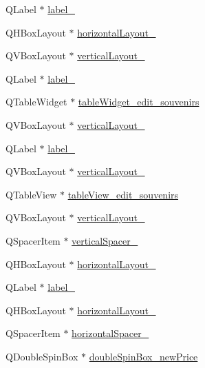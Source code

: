 \begin{DoxyCompactItemize}
\item 
Q\+Label $\ast$ \hyperlink{class_ui___main_window_ac6c19d112b25073d9276c377d00dbadb}{label\+\_}
\item 
Q\+H\+Box\+Layout $\ast$ \hyperlink{class_ui___main_window_a9403b9a7c13814220caeb1748ef9e672}{horizontal\+Layout\+\_}
\item 
Q\+V\+Box\+Layout $\ast$ \hyperlink{class_ui___main_window_a2e443acea8dcdda2848b1ab2daf3876e}{vertical\+Layout\+\_}
\item 
Q\+Label $\ast$ \hyperlink{class_ui___main_window_aa0d07c96f36b94e35e584256ee6b6d9e}{label\+\_}
\item 
Q\+Table\+Widget $\ast$ \hyperlink{class_ui___main_window_a08793e9cc653dd2624f6015cb1b67fe2}{table\+Widget\+\_\+edit\+\_\+souvenirs}
\item 
Q\+V\+Box\+Layout $\ast$ \hyperlink{class_ui___main_window_a1dd03599a38ab88cc01201488e5786b4}{vertical\+Layout\+\_}
\item 
Q\+Label $\ast$ \hyperlink{class_ui___main_window_a92ada1ca7f65b72ecf4cba1198c44380}{label\+\_}
\item 
Q\+V\+Box\+Layout $\ast$ \hyperlink{class_ui___main_window_a9022dbb281d9d46048c96ca1041e0905}{vertical\+Layout\+\_}
\item 
Q\+Table\+View $\ast$ \hyperlink{class_ui___main_window_af977a987af5fe8ca359761cc67c2eb97}{table\+View\+\_\+edit\+\_\+souvenirs}
\item 
Q\+V\+Box\+Layout $\ast$ \hyperlink{class_ui___main_window_a22115df48ffb70e4c1386c3a6f0c2bdb}{vertical\+Layout\+\_}
\item 
Q\+Spacer\+Item $\ast$ \hyperlink{class_ui___main_window_a03070eb30778c51f041c2993781f2bcb}{vertical\+Spacer\+\_}
\item 
Q\+H\+Box\+Layout $\ast$ \hyperlink{class_ui___main_window_a85691c679f9963970b66c42a90e376a6}{horizontal\+Layout\+\_}
\item 
Q\+Label $\ast$ \hyperlink{class_ui___main_window_af6a52c851cb1c8a736f1b7f9abbbb08c}{label\+\_}
\item 
Q\+H\+Box\+Layout $\ast$ \hyperlink{class_ui___main_window_a488ae2286c0922552e7a39a756e337d3}{horizontal\+Layout\+\_}
\item 
Q\+Spacer\+Item $\ast$ \hyperlink{class_ui___main_window_a6f856c300b856ef7886083614f93849c}{horizontal\+Spacer\+\_}
\item 
Q\+Double\+Spin\+Box $\ast$ \hyperlink{class_ui___main_window_af11c9f1c9fd14a1fd8b7cd40dea3b5e5}{double\+Spin\+Box\+\_\+new\+Price}

\end{DoxyCompactItemize}
